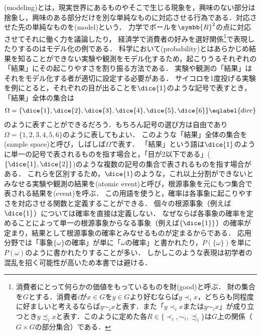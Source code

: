 \documentclass[main.tex]{subfiles}
\begin{document}

(modeling)とは，現実世界にあるものやそこで生じる現象を，興味のない部分は捨象し，興味のある部分だけを別な単純なものに対応させる行為である．対応させた先の単純なものを(model)という．
力学でボールを\(\symbb{R}^2\)の点に対応させてそれに働く力を議論したり，
経済学で消費者の好みを選好関係\footnote{%
消費者にとって何らかの価値をもっているものを財(good)と呼ぶ．
財の集合を\(G\)とする．消費者\(i\)が\(x \in G\)を\(y \in G\)より好むならば\(y \prec_i x\)，どちらも同程度に好ましいと考えるならば\(y \sim_i x\)と表す．また「\(y \prec_i x\)または\(y \sim_i x\)」が成り立つとき\(y \precsim_i x\)と表す．このように定めた各\(R \in \{\prec_i, \sim_i, \precsim_i\}\)は\(G\)上の関係（\(G \times G\)の部分集合）である．
}で表現したりするのはモデル化の例である．
科学において(probability)とはあらかじめ結果を知ることができない実験や観測をモデル化するため，起こりうるそれぞれの「結果」にその起こりやすさを割り振る方法である．
実験や観測の「結果」はそれをモデル化する者が適切に設定する必要がある．
サイコロを1度投げる実験を例にとると，それぞれの目が出ることを\(\dice{1}\)のような記号で表すとき，「結果」全体の集合は
\begin{align}
    \Omega = \{\dice{1}, \dice{2}, \dice{3}, \dice{4}, \dice{5}, \dice{6}\} \eqlabel{dice}
\end{align}
のように表すことができるだろう．もちろん記号の選び方は自由であり\(\Omega = \{1, 2, 3, 4, 5, 6\}\)のように表してもよい．
このような「結果」全体の集合を(sample space)と呼び，しばしば\(\Omega\)で表す．
「結果」という語は\(\dice{1}\)のように単一の記号で表されるものを指す場合と，「目が\(2\)以下である」(\(\{\dice{1}, \dice{2}\}\))のような複数の記号の集合で表されるものを指す場合がある．
これらを区別するため，\(\dice{1}\)のような，これ以上分割ができないとみなせる実験や観測の結果を(atomic event)と呼び，根源事象を元にもつ集合で表される結果を(event)を呼ぶ．
この用語を使うと，確率は各事象に起こりやすさを対応させる関数と定義することができる．
個々の根源事象（例えば\(\dice{1}\)）については確率を直接は定義しない．
なぜならば各事象の確率を定めることによって単一の根源事象からなる事象（例えば\(\{\dice{1}\}\)）の確率が定まり，結果として根源事象の確率とみなせるものが定まるからである．
応用分野では「事象\(\{\omega\}\)の確率」が単に「\(\omega\)の確率」と書かれたり，\(P(\{\omega\})\)を単に\(P(\omega)\)のように書かれたりすることが多い．
しかしこのような表現は初学者の混乱を招く可能性が高いため本書では避ける．
\end{document}
